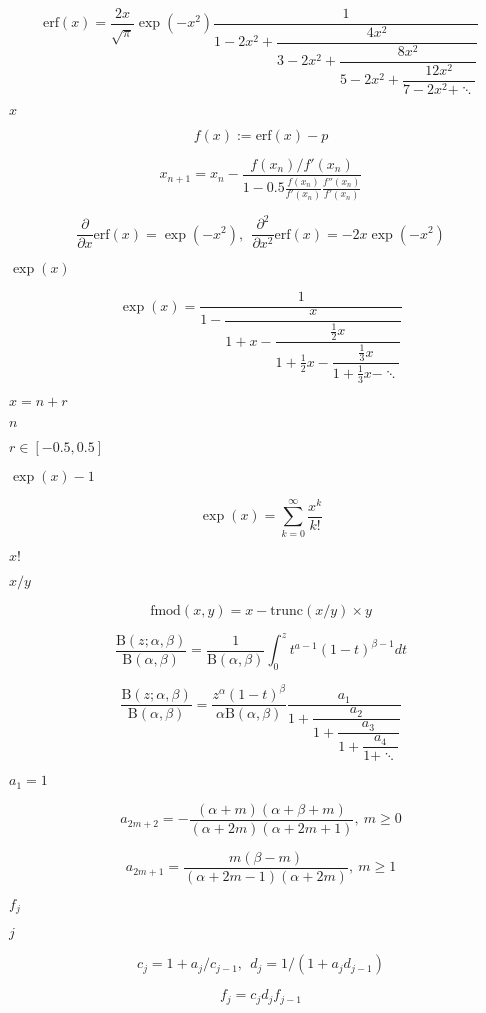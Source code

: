 \documentclass{article}
\begin{document}
\[ \text{erf}(x) = \frac{2x}{\sqrt{\pi}} \exp(-x^2) \dfrac{1}{1 - 2x^2 + \dfrac{4x^2}{3 - 2x^2 + \dfrac{8x^2}{5 - 2x^2 + \dfrac{12x^2}{7 - 2x^2 + \ddots}}}} \]
\pagebreak

$ x $
\pagebreak

\[ f(x) := \text{erf}(x) - p \]
\pagebreak

\[ x_{n+1} = x_n - \frac{f(x_n)/f'(x_n)}{1 - 0.5 \frac{f(x_n)}{f'(x_n)} \frac{f''(x_n)}{f'(x_n)} } \]
\pagebreak

\[ \frac{\partial}{\partial x} \text{erf}(x) = \exp(-x^2), \ \ \frac{\partial^2}{\partial x^2} \text{erf}(x) = -2x\exp(-x^2) \]
\pagebreak

$ \exp(x) $
\pagebreak

\[ \exp(x) = \dfrac{1}{1-\dfrac{x}{1+x-\dfrac{\frac{1}{2}x}{1 + \frac{1}{2}x - \dfrac{\frac{1}{3}x}{1 + \frac{1}{3}x - \ddots}}}} \]
\pagebreak

$ x = n + r $
\pagebreak

$ n $
\pagebreak

$ r \in [-0.5,0.5] $
\pagebreak

$ \exp(x) - 1 $
\pagebreak

\[ \exp(x) = \sum_{k=0}^\infty \dfrac{x^k}{k!} \]
\pagebreak

$ x! $
\pagebreak

$ x / y $
\pagebreak

\[ \text{fmod}(x,y) = x - \text{trunc}(x/y) \times y \]
\pagebreak

\[ \frac{\text{B}(z;\alpha,\beta)}{\text{B}(\alpha,\beta)} = \frac{1}{\text{B}(\alpha,\beta)}\int_0^z t^{a-1} (1-t)^{\beta-1} dt \]
\pagebreak

\[ \frac{\text{B}(z;\alpha,\beta)}{\text{B}(\alpha,\beta)} = \frac{z^{\alpha} (1-t)^{\beta}}{\alpha \text{B}(\alpha,\beta)} \dfrac{a_1}{1 + \dfrac{a_2}{1 + \dfrac{a_3}{1 + \dfrac{a_4}{1 + \ddots}}}} \]
\pagebreak

$ a_1 = 1 $
\pagebreak

\[ a_{2m+2} = - \frac{(\alpha + m)(\alpha + \beta + m)}{(\alpha + 2m)(\alpha + 2m + 1)}, \ m \geq 0 \]
\pagebreak

\[ a_{2m+1} = \frac{m(\beta - m)}{(\alpha + 2m - 1)(\alpha + 2m)}, \ m \geq 1 \]
\pagebreak

$ f_j $
\pagebreak

$ j $
\pagebreak

\[ c_j = 1 + a_j / c_{j-1}, \ \ d_j = 1 / (1 + a_j d_{j-1}) \]
\pagebreak

\[ f_j = c_j d_j f_{j-1} \]
\pagebreak
\end{document}
